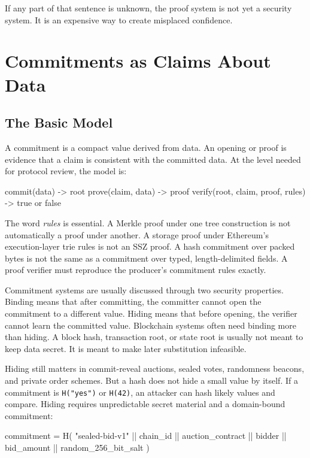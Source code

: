 If any part of that sentence is unknown, the proof system is not yet a security system. It is an expensive way to create misplaced confidence.

\section{Commitments as Claims About Data}

\subsection{The Basic Model}

A commitment is a compact value derived from data. An opening or proof is evidence that a claim is consistent with the committed data. At the level needed for protocol review, the model is:

\begin{codeblock}
commit(data) -> root
prove(claim, data) -> proof
verify(root, claim, proof, rules) -> true or false
\end{codeblock}

The word \emph{rules} is essential. A Merkle proof under one tree construction is not automatically a proof under another. A storage proof under Ethereum's execution-layer trie rules is not an SSZ proof. A hash commitment over packed bytes is not the same as a commitment over typed, length-delimited fields. A proof verifier must reproduce the producer's commitment rules exactly.

Commitment systems are usually discussed through two security properties. Binding means that after committing, the committer cannot open the commitment to a different value. Hiding means that before opening, the verifier cannot learn the committed value. Blockchain systems often need binding more than hiding. A block hash, transaction root, or state root is usually not meant to keep data secret. It is meant to make later substitution infeasible.

Hiding still matters in commit-reveal auctions, sealed votes, randomness beacons, and private order schemes. But a hash does not hide a small value by itself. If a commitment is \texttt{H("yes")} or \texttt{H(42)}, an attacker can hash likely values and compare. Hiding requires unpredictable secret material and a domain-bound commitment:

\begin{codeblock}
commitment = H(
    "sealed-bid-v1" ||
    chain_id ||
    auction_contract ||
    bidder ||
    bid_amount ||
    random_256_bit_salt
)
\end{codeblock}

